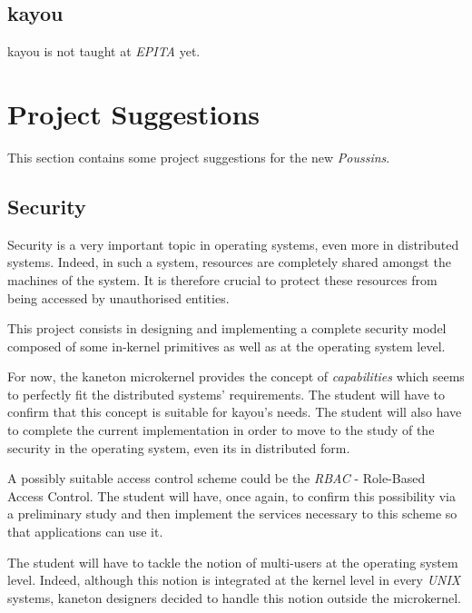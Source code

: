 \begin{multicols}{2}
%
%

\subsection{kayou}

kayou is not taught at \textit{EPITA} yet.

%
%

\section{Project Suggestions}

This section contains some project suggestions for the new \textit{Poussins}.

%
%

\subsection{Security}

Security is a very important topic in operating systems, even more in
distributed systems. Indeed, in such a system, resources are completely
shared amongst the machines of the system. It is therefore crucial to protect
these resources from being accessed by unauthorised entities.

This project consists in designing and implementing a complete security
model composed of some in-kernel primitives as well as at the operating
system level.

For now, the kaneton microkernel provides the concept of \textit{capabilities}
which seems to perfectly fit the distributed systems' requirements. The student
will have to confirm that this concept is suitable for kayou's needs. The
student will also have to complete the current implementation in order to move
to the study of the security in the operating system, even its in distributed
form.

A possibly suitable access control scheme could be the \textit{RBAC} -
Role-Based Access Control. The student will have, once again, to confirm this
possibility via a preliminary study and then implement the services
necessary to this scheme so that applications can use it.

The student will have to tackle the notion of multi-users at the operating
system level. Indeed, although this notion is integrated at the kernel
level in every \textit{UNIX} systems, kaneton designers decided to handle this
notion outside the microkernel.


\end{multicols}
